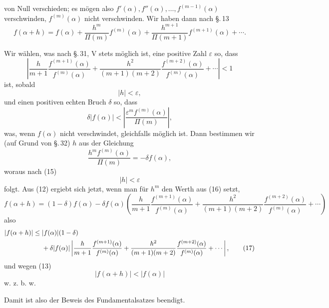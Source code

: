 
von Null verschieden; es mögen also $f'(\alpha),f''(\alpha),\ldots,f^{(m-1)}(\alpha)$ verschwinden, $f^{(m)}(\alpha)$ nicht verschwinden. Wir haben dann nach \S.\,13
\begin{equation}
 f(\alpha+h)=f(\alpha)+\frac{h^m}{\Pi(m)}f^{(m)}(\alpha)
 +\frac{h^{m+1}}{\Pi(m+1)}f^{(m+1)}(\alpha)+\cdots .
\tag{12}
\end{equation}

Wir wählen, was nach \S.\,31, V stets möglich ist, eine positive Zahl $\varepsilon$ so, dass
\begin{equation}
\left|\frac{h}{m+1}\frac{f^{(m+1)}(\alpha)}{f^{(m)}(\alpha)}
+\frac{h^2}{(m+1)(m+2)}\frac{f^{(m+2)}(\alpha)}{f^{(m)}(\alpha)}+\cdots\right|<1
\tag{13}
\end{equation}
ist, sobald
\begin{equation}
 |h|<\varepsilon,
\tag{14}
\end{equation}
und einen positiven echten Bruch $\delta$ so, dass
\begin{equation}
 \delta |f(\alpha)|<\left|\frac{\varepsilon^m f^{(m)}(\alpha)}{\Pi(m)}\right|,
\tag{15}
\end{equation}
was, wenn $f(\alpha)$ nicht verschwindet, gleichfalls möglich ist. Dann bestimmen wir (auf Grund von \S.\,32) $h$ aus der Gleichung
\begin{equation}
 \frac{h^m f^{(m)}(\alpha)}{\Pi(m)}=-\delta f(\alpha),
\tag{16}
\end{equation}
woraus nach (15)
\[
 |h|<\varepsilon
\]
folgt. Aus (12) ergiebt sich jetzt, wenn man für $h^m$ den Werth aus (16) setzt,
\[
 f(\alpha+h)=(1-\delta)f(\alpha)
 -\delta f(\alpha)\left(\frac{h}{m+1}\frac{f^{(m+1)}(\alpha)}{f^{(m)}(\alpha)}
 +\frac{h^2}{(m+1)(m+2)}\frac{f^{(m+2)}(\alpha)}{f^{(m)}(\alpha)}+\cdots\right)
\]
also
\begin{align}
 |f(\alpha+h)|\le{}& |f(\alpha)|(1-\delta)\notag\\
 &+\delta |f(\alpha)|\left|\frac{h}{m+1}\frac{f^{(m+1)}(\alpha)}{f^{(m)}(\alpha)}
 +\frac{h^2}{(m+1)(m+2)}\frac{f^{(m+2)}(\alpha)}{f^{(m)}(\alpha)}+\cdots\right|,
\tag{17}
\end{align}
und wegen (13)
\begin{equation}
 |f(\alpha+h)|<|f(\alpha)|\tag{18}
\end{equation}
\noindent\hfill w. z. b. w.

Damit ist also der Beweis des Fundamentalsatzes beendigt.
